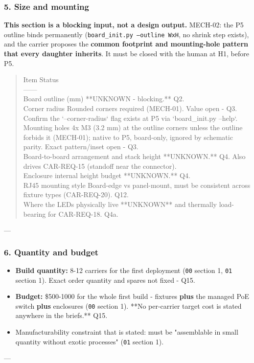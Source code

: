 \documentclass[11pt,a4paper]{article}
\begin{document}
\subsubsection*{5. Size and mounting}
\textbf{This section is a blocking input, not a design output.} MECH-02: the P5 outline binds permanently (\texttt{board\_init.py --outline WxH}, no shrink step exists), and the carrier proposes the \textbf{common footprint and mounting-hole pattern that every daughter inherits}. It must be closed with the human at H1, before P5.

\begin{quote}\small\ttfamily\raggedright
\textbar{} Item \textbar{} Status \textbar{}\\
\textbar{}---\textbar{}---\textbar{}\\
\textbar{} Board outline (mm) \textbar{} {*}{*}UNKNOWN - blocking.{*}{*} Q2. \textbar{}\\
\textbar{} Corner radius \textbar{} Rounded corners required (MECH-01). Value open - Q3. Confirm the `--corner-radius` flag exists at P5 via `board\_init.py --help`. \textbar{}\\
\textbar{} Mounting holes \textbar{} 4x M3 (3.2 mm) at the outline corners unless the outline forbids it (MECH-01); native to P5, board-only, ignored by schematic parity. Exact pattern/inset open - Q3. \textbar{}\\
\textbar{} Board-to-board arrangement and stack height \textbar{} {*}{*}UNKNOWN.{*}{*} Q4. Also drives CAR-REQ-15 (standoff near the connector). \textbar{}\\
\textbar{} Enclosure internal height budget \textbar{} {*}{*}UNKNOWN.{*}{*} Q4. \textbar{}\\
\textbar{} RJ45 mounting style \textbar{} Board-edge vs panel-mount, must be consistent across fixture types (CAR-REQ-20). Q12. \textbar{}\\
\textbar{} Where the LEDs physically live \textbar{} {*}{*}UNKNOWN{*}{*} and thermally load-bearing for CAR-REQ-18. Q4a. \textbar{}
\end{quote}
---

\subsubsection*{6. Quantity and budget}
\begin{itemize}
\item \textbf{Build quantity:} 8-12 carriers for the first deployment (\texttt{00} section 1, \texttt{01} section 1).
Exact order quantity and spares not fixed - Q15.
\item \textbf{Budget:} \$500-1000 for the whole first build - fixtures \textbf{plus} the managed PoE switch
\textbf{plus} enclosures (\texttt{00} section 1). {*}{*}No per-carrier target cost is stated anywhere in the
briefs.{*}{*} Q15.
\item Manufacturability constraint that is stated: must be "assemblable in small quantity without
exotic processes" (\texttt{01} section 1).
\end{itemize}
---
\end{document}
